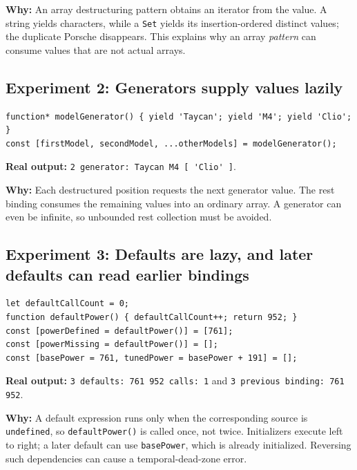 \documentclass[
  9pt,
]{article}
\newcommand{\passthrough}[1]{#1}
\begin{document}
\textbf{Why:} An array destructuring pattern obtains an iterator from
the value. A string yields characters, while a
\passthrough{\lstinline!Set!} yields its insertion-ordered distinct
values; the duplicate Porsche disappears. This explains why an array
\emph{pattern} can consume values that are not actual arrays.

\subsection{Experiment 2: Generators supply values
lazily}\label{experiment-2-generators-supply-values-lazily}

\begin{lstlisting}
function* modelGenerator() { yield 'Taycan'; yield 'M4'; yield 'Clio'; }
const [firstModel, secondModel, ...otherModels] = modelGenerator();
\end{lstlisting}

\textbf{Real output:}
\passthrough{\lstinline!2 generator: Taycan M4 [ 'Clio' ]!}.

\textbf{Why:} Each destructured position requests the next generator
value. The rest binding consumes the remaining values into an ordinary
array. A generator can even be infinite, so unbounded rest collection
must be avoided.

\subsection{Experiment 3: Defaults are lazy, and later defaults can read
earlier
bindings}\label{experiment-3-defaults-are-lazy-and-later-defaults-can-read-earlier-bindings}

\begin{lstlisting}
let defaultCallCount = 0;
function defaultPower() { defaultCallCount++; return 952; }
const [powerDefined = defaultPower()] = [761];
const [powerMissing = defaultPower()] = [];
const [basePower = 761, tunedPower = basePower + 191] = [];
\end{lstlisting}

\textbf{Real output:}
\passthrough{\lstinline!3 defaults: 761 952 calls: 1!} and
\passthrough{\lstinline!3 previous binding: 761 952!}.

\textbf{Why:} A default expression runs only when the corresponding
source is \passthrough{\lstinline!undefined!}, so
\passthrough{\lstinline!defaultPower()!} is called once, not twice.
Initializers execute left to right; a later default can use
\passthrough{\lstinline!basePower!}, which is already initialized.
Reversing such dependencies can cause a temporal-dead-zone error.
\end{document}
